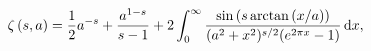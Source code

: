 \[\zeta\left(s,a\right)=\frac{1}{2}a^{-s}+\frac{a^{1-s}}{s-1}+2\int_{0}^{\infty}%
\frac{\sin\left(s\operatorname{arctan}\left(x/a\right)\right)}{(a^{2}+x^{2})^{%
s/2}(e^{2\pi x}-1)}\,\mathrm{d}x,\]